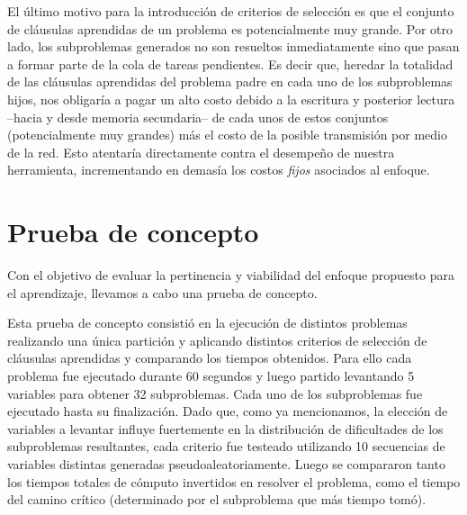 El último motivo para la introducción de criterios de selección es que el
conjunto de cláusulas aprendidas de un problema es potencialmente muy grande.
Por otro lado, los subproblemas generados no son resueltos inmediatamente sino
que pasan a formar parte de la cola de tareas pendientes. Es decir que,
heredar la totalidad de las cláusulas aprendidas del problema padre en cada
uno de los subproblemas hijos, nos obligaría a pagar un alto costo debido a la
escritura y posterior lectura --hacia y desde memoria secundaria-- de cada
unos de estos conjuntos (potencialmente muy grandes) más el costo de la
posible transmisión por medio de la red. Esto atentaría directamente contra el
desempeño de nuestra herramienta, incrementando en demasía los costos
\emph{fijos} asociados al enfoque.




\section{Prueba de concepto}

Con el objetivo de evaluar la pertinencia y viabilidad del enfoque propuesto
para el aprendizaje, llevamos a cabo una prueba de concepto. 


Esta prueba de concepto consistió en la ejecución de distintos problemas
realizando una única partición y aplicando distintos criterios de selección de
cláusulas aprendidas y comparando los tiempos obtenidos. Para ello cada
problema fue ejecutado durante 60 segundos y luego partido levantando 5
variables para obtener 32 subproblemas. Cada uno de los subproblemas fue
ejecutado hasta su finalización. Dado que, como ya mencionamos, la elección de
variables a levantar influye fuertemente en la distribución de dificultades de
los subproblemas resultantes, cada criterio fue testeado utilizando 10
secuencias de variables distintas generadas pseudoaleatoriamente. Luego se
compararon tanto los tiempos totales de cómputo invertidos en resolver el
problema, como el tiempo del camino crítico (determinado por el subproblema
que más tiempo tomó).



